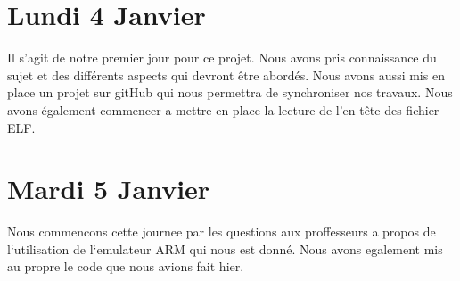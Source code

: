\documentclass[12pt, a4paper]{article}
\begin{document}
\section{Lundi 4 Janvier}

Il s'agit de notre premier jour pour ce projet. Nous avons pris 
connaissance du sujet et des différents aspects qui devront être 
abordés. Nous avons aussi mis en place un projet sur gitHub qui nous 
permettra de synchroniser nos travaux. Nous avons également 
commencer a mettre en place la lecture de l'en-t\^ete des fichier 
ELF.

\section{Mardi 5 Janvier}

Nous commencons cette journee par les questions aux proffesseurs a propos de 
l`utilisation de l`emulateur ARM qui nous est donn\'e. Nous avons egalement 
mis au propre le code que nous avions fait hier.
\end{document}

